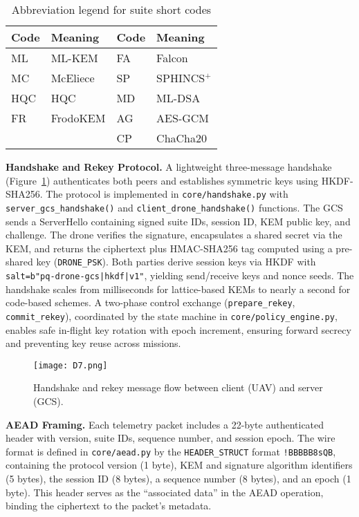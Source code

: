 \documentclass[sigconf,natbib=false]{acmart}
\begin{document}
\begin{table}[ht]
\centering
\caption{Abbreviation legend for suite short codes}
\label{tab:suite_legend}
\begingroup
\small
\setlength{\tabcolsep}{4pt}
\begin{tabular}{@{}llll@{}}
\toprule
\textbf{Code} & \textbf{Meaning} & \textbf{Code} & \textbf{Meaning} \\
\midrule
ML & ML-KEM & FA & Falcon \\
MC & McEliece & SP & SPHINCS$^+$ \\
HQC & HQC & MD & ML-DSA \\
FR & FrodoKEM & AG & AES-GCM \\
   &          & CP & ChaCha20 \\
\bottomrule
\end{tabular}
\endgroup
\end{table}

\textbf{Handshake and Rekey Protocol.}
A lightweight three-message handshake (Figure~\ref{fig:handshake_flow}) authenticates both peers and establishes symmetric keys using HKDF-SHA256. The protocol is implemented in \texttt{core/handshake.py} with \texttt{server\_gcs\_handshake()} and \texttt{client\_drone\_handshake()} functions. The GCS sends a ServerHello containing signed suite IDs, session ID, KEM public key, and challenge. The drone verifies the signature, encapsulates a shared secret via the KEM, and returns the ciphertext plus HMAC-SHA256 tag computed using a pre-shared key (\texttt{DRONE\_PSK}). Both parties derive session keys via HKDF with \texttt{salt=b"pq-drone-gcs|hkdf|v1"}, yielding send/receive keys and nonce seeds. The handshake scales from milliseconds for lattice-based KEMs to nearly a second for code-based schemes. A two-phase control exchange (\texttt{prepare\_rekey}, \texttt{commit\_rekey}), coordinated by the state machine in \texttt{core/policy\_engine.py}, enables safe in-flight key rotation with epoch increment, ensuring forward secrecy and preventing key reuse across missions.

\begin{figure}[h]
  \centering
  \texttt{[image: D7.png]}
  \caption{Handshake and rekey message flow between client (UAV) and server (GCS).}
  \label{fig:handshake_flow}
\end{figure}

\textbf{AEAD Framing.}
Each telemetry packet includes a 22-byte authenticated header with version, suite IDs, sequence number, and session epoch. The wire format is defined in \texttt{core/aead.py} by the \texttt{HEADER\_STRUCT} format \texttt{!BBBBB8sQB}, containing the protocol version (1 byte), KEM and signature algorithm identifiers (5 bytes), the session ID (8 bytes), a sequence number (8 bytes), and an epoch (1 byte). This header serves as the ``associated data'' in the AEAD operation, binding the ciphertext to the packet's metadata.
\end{document}
